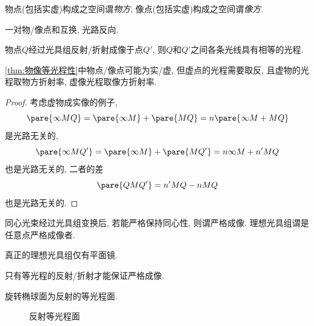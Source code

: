 \documentclass{ctexart}
\begin{document}
物点(包括实虚)构成之空间谓\emph{物方}, 像点(包括实虚)构成之空间谓\emph{像方}.
\begin{theorem}[物像共轭]
    一对物/像点和互换, 光路反向.
\end{theorem}
\begin{finale}
    \begin{theorem}
        \label{thm:物像等光程性}
        物点$Q$经过光具组反射/折射成像于点$Q'$, 则$Q$和$Q'$之间各条光线具有相等的光程.
    \end{theorem}
\end{finale}
\begin{pitfall}
    \cref{thm:物像等光程性}中物点/像点可能为实/虚, 但虚点的光程需要取反, 且虚物的光程取物方折射率, 虚像光程取像方折射率.
\end{pitfall}
\begin{proof}
    考虑虚物成实像的例子,
    \[ \pare{\infty MQ} = \pare{\infty M} + \pare{MQ} = n\pare{\infty M + MQ} \]
    是光路无关的,
    \[ \pare{\infty MQ'} = \pare{\infty M} + \pare{MQ'} = n\infty M  + n'MQ \]
    也是光路无关的, 二者的差
    \[ \pare{QMQ'} = n'MQ - nMQ \]
    也是光路无关的.
\end{proof}
同心光束经过光具组变换后, 若能严格保持同心性, 则谓严格成像. 理想光具组谓是任意点严格成像者.
\begin{remark}
    真正的理想光具组仅有平面镜.
\end{remark}
\begin{lemma}
    只有等光程的反射/折射才能保证严格成像.
\end{lemma}
\begin{sample}
    \begin{ex}
        旋转椭球面为反射的等光程面.
    \end{ex}
\end{sample}
\begin{figure}[ht]
    \centering
    \begin{subfigure}{.45\textwidth}
        \centering
    \end{subfigure}
    \begin{subfigure}{.45\textwidth}
        \centering
    \end{subfigure}
    \begin{subfigure}{.45\textwidth}
        \centering
    \end{subfigure}
    \begin{subfigure}{.45\textwidth}
        \centering
    \end{subfigure}
    \caption{反射等光程面}
\end{figure}
\end{document}
